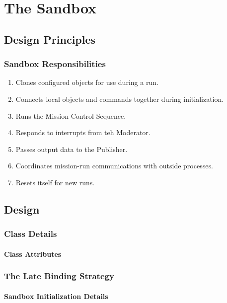 \chapter{\label{chapter:Sandbox}The Sandbox}

\section{Design Principles}

\subsection{Sandbox Responsibilities}

\begin{enumerate}
\item Clones configured objects for use during a run.
\item Connects local objects and commands together during initialization.
\item Runs the Mission Control Sequence.
\item Responds to interrupts from teh Moderator.
\item Passes output data to the Publisher.
\item Coordinates mission-run communications with outside processes.
\item Resets itself for new runs.
\end{enumerate}

\section{Design}

\subsection{Class Details}

\subsubsection{Class Attributes}

\subsection{\label{section:SandboxLateBinding}The Late Binding Strategy}

\subsubsection{\label{section:SandboxInitialization}Sandbox Initialization Details}


